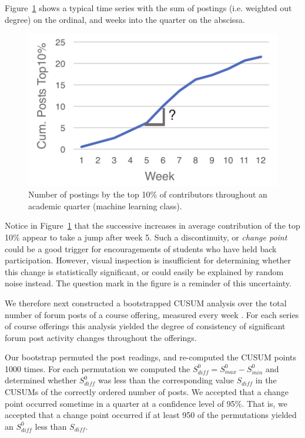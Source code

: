 Figure~\ref{fig:cs229OutDeg} shows a typical time series with the sum
of postings (i.e. weighted out degree) on the ordinal, and weeks into
the quarter on the abscissa.
\begin{figure}[htp]
       \centering
       \includegraphics{Figs/CS229Fall15DataContributionsNoFrills.pdf}
       \caption{\textnormal{Number of postings by the top 10\% of
           contributors throughout an academic quarter (machine
           learning class).}}
       \label{fig:cs229OutDeg}
\end{figure}
Notice in Figure~\ref{fig:cs229OutDeg} that the successive increases
in average contribution of the top 10\% appear to take a jump after
week 5. Such a discontinuity, or {\em change point} could be a good
trigger for encouragements of students who have held back
participation. However, visual inspection is insufficient for
determining whether this change is statistically significant, or could
easily be explained by random noise instead. The question mark in the
figure is a reminder of this uncertainty.

We therefore next constructed a bootstrapped CUSUM analysis over the
total number of forum posts of a course offering, measured every week
\cite{tayl16}.  For each series of course offerings this analysis
yielded the degree of consistency of significant forum post activity
changes throughout the offerings.

Our bootstrap permuted the post readings, and re-computed the CUSUM
points 1000 times. For each permutation we computed the $S_{diff}^0 =
S_{max}^0-S_{min}^0$ and determined whether $S_{diff}^0$ was less than
the corresponding value $S_{diff}$ in the CUSUMs of the correctly
ordered number of posts. We accepted that a change point occurred
sometime in a quarter at a confidence level of 95\%. That is, we
accepted that a change point occurred if at least 950 of the
permutations yielded an $S_{diff}^0$ less than $S_{diff}$.

